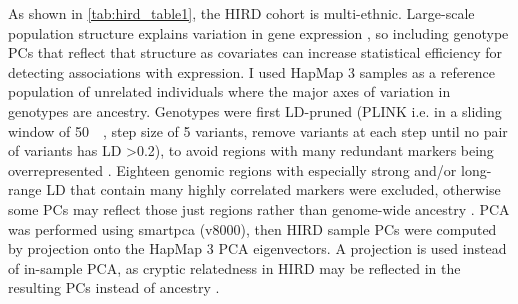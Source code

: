 As shown in \cref{tab:hird_table1}, the \gls{HIRD} cohort is multi-ethnic.
Large-scale population structure explains variation in gene expression \autocite{stegle2012UsingProbabilisticEstimation,brown2018ExpressionReflectsPopulation}, 
so including genotype \glspl{PC} that reflect that structure as covariates can increase statistical efficiency for detecting associations with expression.
I used HapMap 3 samples \autocite{theinternationalhapmap3consortium2010IntegratingCommonRare} as a reference population of unrelated individuals where the major axes of variation in genotypes are ancestry.
Genotypes were first \gls{LD}-pruned (PLINK  i.e. in a sliding window of \SI{50}{\kilo\bp}, step size of 5 variants, remove variants at each step until no pair of variants has \gls{LD} \num{>0.2}), 
to avoid regions with many redundant markers being overrepresented \autocite{price2006PrincipalComponentsAnalysis,abdellaoui2013PopulationStructureMigration}.
Eighteen genomic regions with especially strong and/or long-range \gls{LD} that contain many highly correlated markers were excluded, otherwise some \glspl{PC} may reflect those just regions rather than genome-wide ancestry \autocite{price2006PrincipalComponentsAnalysis,prive2020EfficientToolkitImplementing}.
\Gls{PCA} was performed using smartpca (v8000),
then \gls{HIRD} sample \glspl{PC} were computed by projection onto the HapMap 3 \gls{PCA} eigenvectors.
%
A projection is used instead of in-sample \gls{PCA}, as cryptic relatedness in \gls{HIRD} may be reflected in the resulting \glspl{PC} instead of ancestry \autocite{price2010NewApproachesPopulation}.
